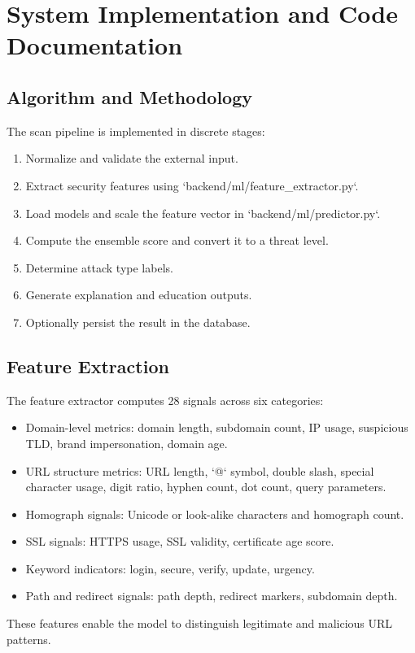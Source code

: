 \documentclass[conference]{IEEEtran}
\begin{document}
\section{System Implementation and Code Documentation}
\subsection{Algorithm and Methodology}
The scan pipeline is implemented in discrete stages:
\begin{enumerate}[itemsep=0pt,topsep=0pt]
    \item Normalize and validate the external input.
    \item Extract security features using `backend/ml/feature_extractor.py`.
    \item Load models and scale the feature vector in `backend/ml/predictor.py`.
    \item Compute the ensemble score and convert it to a threat level.
    \item Determine attack type labels.
    \item Generate explanation and education outputs.
    \item Optionally persist the result in the database.
\end{enumerate}

\subsection{Feature Extraction}
The feature extractor computes 28 signals across six categories:
\begin{itemize}[itemsep=0pt,topsep=0pt]
    \item Domain-level metrics: domain length, subdomain count, IP usage, suspicious TLD, brand impersonation, domain age.
    \item URL structure metrics: URL length, `@` symbol, double slash, special character usage, digit ratio, hyphen count, dot count, query parameters.
    \item Homograph signals: Unicode or look-alike characters and homograph count.
    \item SSL signals: HTTPS usage, SSL validity, certificate age score.
    \item Keyword indicators: login, secure, verify, update, urgency.
    \item Path and redirect signals: path depth, redirect markers, subdomain depth.
\end{itemize}
These features enable the model to distinguish legitimate and malicious URL patterns.
\end{document}

